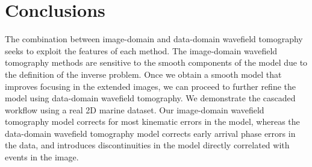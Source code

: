 \section{Conclusions}
The combination between image-domain and data-domain wavefield
tomography seeks to exploit the features of each method. The image-domain 
wavefield tomography methods are sensitive to the smooth components
of the model due to the definition of the inverse problem. Once we obtain
 a smooth model that improves focusing in the extended images,
 we can proceed to further refine the model using data-domain
 wavefield tomography. We demonstrate the cascaded workflow using
 a real 2D marine dataset. Our image-domain wavefield tomography
model corrects for most kinematic errors in the model, 
whereas
the data-domain wavefield tomography model 
corrects early arrival phase errors in the data, and
introduces  discontinuities in the model directly correlated with events in 
the image.

%
%
